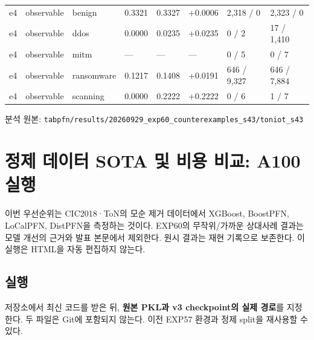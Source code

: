 \begin{landscape}
\begin{longtable}
{}e4 & observable & benign & 0.3321 & 0.3327 & +\allowbreak{}0.0006 & 2,318 /\allowbreak{} 0 & 2,323 /\allowbreak{} 0 \\
{}e4 & observable & ddos & 0.0000 & 0.0235 & +\allowbreak{}0.0235 & 0 /\allowbreak{} 2 & 17 /\allowbreak{} 1,410 \\
{}e4 & observable & mitm & — & — & — & 0 /\allowbreak{} 5 & 0 /\allowbreak{} 7 \\
{}e4 & observable & ransomware & 0.1217 & 0.1408 & +\allowbreak{}0.0191 & 646 /\allowbreak{} 9,327 & 646 /\allowbreak{} 7,884 \\
{}e4 & observable & scanning & 0.0000 & 0.2222 & +\allowbreak{}0.2222 & 0 /\allowbreak{} 6 & 1 /\allowbreak{} 7 \\
\bottomrule
\end{longtable}
\endgroup
\end{landscape}
분석 원본: \texttt{tabpfn/\allowbreak{}\allowbreak{}r\allowbreak{}esults/\allowbreak{}\allowbreak{}2\allowbreak{}0260929\_\allowbreak{}\allowbreak{}exp60\_\allowbreak{}\allowbreak{}co\allowbreak{}unterexa\allowbreak{}mples\_\allowbreak{}\allowbreak{}s4\allowbreak{}3/\allowbreak{}\allowbreak{}toniot\allowbreak{}\_\allowbreak{}\allowbreak{}s43}



\section{정제 데이터 SOTA 및 비용 비교: A100 실행}
이번 우선순위는 CIC2018·ToN의 모순 제거 데이터에서 XGBoost, BoostPFN, LoCalPFN, DistPFN을 측정하는 것이다. EXP60의 무작위/\allowbreak{}가까운 상대사례 결과는 모델 개선의 근거와 발표 본문에서 제외한다. 원시 결과는 재현 기록으로 보존한다. 이 실행은 HTML을 자동 편집하지 않는다.

\subsection{실행}
저장소에서 최신 코드를 받은 뒤, \textbf{원본 PKL과 v3 checkpoint의 실제 경로}를 지정한다. 두 파일은 Git에 포함되지 않는다. 이전 EXP57 환경과 정제 split을 재사용할 수 있다.


